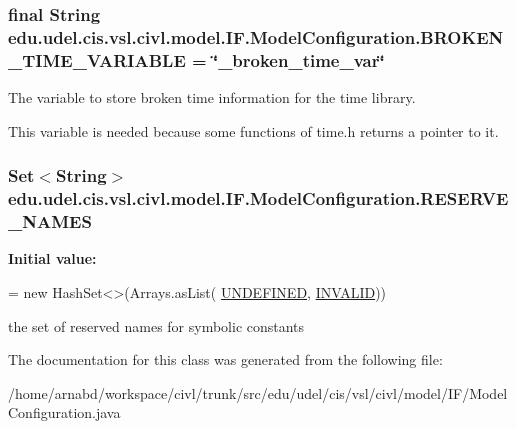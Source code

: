 \subsubsection[{B\+R\+O\+K\+E\+N\+\_\+\+T\+I\+M\+E\+\_\+\+V\+A\+R\+I\+A\+B\+L\+E}]{\setlength{\rightskip}{0pt plus 5cm}final String edu.\+udel.\+cis.\+vsl.\+civl.\+model.\+I\+F.\+Model\+Configuration.\+B\+R\+O\+K\+E\+N\+\_\+\+T\+I\+M\+E\+\_\+\+V\+A\+R\+I\+A\+B\+L\+E = \char`\"{}\+\_\+broken\+\_\+time\+\_\+var\char`\"{}\hspace{0.3cm}{\ttfamily [static]}}\label{classedu_1_1udel_1_1cis_1_1vsl_1_1civl_1_1model_1_1IF_1_1ModelConfiguration_abee0bec5f2dd8436a04329f8faa22a27}


The variable to store broken time information for the time library. 

This variable is needed because some functions of time.\+h returns a pointer to it. \hypertarget{classedu_1_1udel_1_1cis_1_1vsl_1_1civl_1_1model_1_1IF_1_1ModelConfiguration_a78ee8932e5d89f299c40bb9d3035d138}{}
\subsubsection[{R\+E\+S\+E\+R\+V\+E\+\_\+\+N\+A\+M\+E\+S}]{\setlength{\rightskip}{0pt plus 5cm}Set$<$String$>$ edu.\+udel.\+cis.\+vsl.\+civl.\+model.\+I\+F.\+Model\+Configuration.\+R\+E\+S\+E\+R\+V\+E\+\_\+\+N\+A\+M\+E\+S\hspace{0.3cm}{\ttfamily [static]}}\label{classedu_1_1udel_1_1cis_1_1vsl_1_1civl_1_1model_1_1IF_1_1ModelConfiguration_a78ee8932e5d89f299c40bb9d3035d138}
{\bfseries Initial value\+:}
\begin{DoxyCode}
= \textcolor{keyword}{new} HashSet<>(Arrays.asList(
            \hyperlink{classedu_1_1udel_1_1cis_1_1vsl_1_1civl_1_1model_1_1IF_1_1ModelConfiguration_a5c257b078c9fbf86058a81aac880f866}{UNDEFINED}, \hyperlink{classedu_1_1udel_1_1cis_1_1vsl_1_1civl_1_1model_1_1IF_1_1ModelConfiguration_a689f1d27b422d5630ba02a59d34e8ab3}{INVALID}))
\end{DoxyCode}


the set of reserved names for symbolic constants 



The documentation for this class was generated from the following file\+:\begin{DoxyCompactItemize}
\item 
/home/arnabd/workspace/civl/trunk/src/edu/udel/cis/vsl/civl/model/\+I\+F/Model\+Configuration.\+java\end{DoxyCompactItemize}
